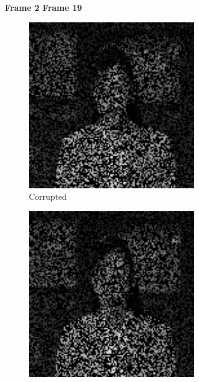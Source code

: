 \begin{figure}[!ht]
  \centering
  \textbf{\hspace{0.2in} Frame 2 \hspace{1.5in} Frame 19\hspace{0.5in}\vspace{0.2in}}
  \begin{subfigure}{0.4\textwidth}
    \centering
    \includegraphics[width=0.8\textwidth]{Chapter7/Images/akiyo40_masked_2.png}
    \caption{Corrupted}
  \end{subfigure}
  \begin{subfigure}{0.4\textwidth}
    \centering
    \includegraphics[width=0.8\textwidth]{Chapter7/Images/akiyo40_masked_19.png}

\end{subfigure}
\end{figure}
